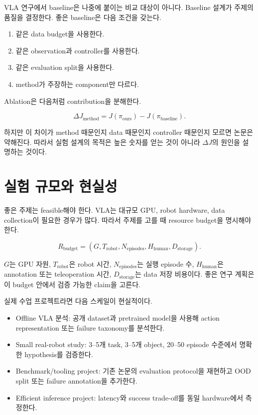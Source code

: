 VLA 연구에서 baseline은 나중에 붙이는 비교 대상이 아니다. Baseline 설계가 주제의 품질을 결정한다. 좋은 baseline은 다음 조건을 갖는다.

\begin{enumerate}
  \item 같은 data budget을 사용한다.
  \item 같은 observation과 controller를 사용한다.
  \item 같은 evaluation split을 사용한다.
  \item method가 주장하는 component만 다르다.
\end{enumerate}

Ablation은 다음처럼 contribution을 분해한다.

\begin{equation}
  \Delta J_{\mathrm{method}}
  =
  J(\pi_{\mathrm{ours}})
  -
  J(\pi_{\mathrm{baseline}}).
\end{equation}

하지만 이 차이가 method 때문인지 data 때문인지 controller 때문인지 모르면 논문은 약해진다. 따라서 실험 설계의 목적은 높은 숫자를 얻는 것이 아니라 $\Delta J$의 원인을 설명하는 것이다.

\section{실험 규모와 현실성}

좋은 주제는 feasible해야 한다. VLA는 대규모 GPU, robot hardware, data collection이 필요한 경우가 많다. 따라서 주제를 고를 때 resource budget을 명시해야 한다.

\begin{equation}
  R_{\mathrm{budget}}
  =
  (G, T_{\mathrm{robot}}, N_{\mathrm{episodes}}, H_{\mathrm{human}}, D_{\mathrm{storage}}).
\end{equation}

$G$는 GPU 자원, $T_{\mathrm{robot}}$은 robot 시간, $N_{\mathrm{episodes}}$는 실행 episode 수, $H_{\mathrm{human}}$은 annotation 또는 teleoperation 시간, $D_{\mathrm{storage}}$는 data 저장 비용이다. 좋은 연구 계획은 이 budget 안에서 검증 가능한 claim을 고른다.

실제 수업 프로젝트라면 다음 스케일이 현실적이다.

\begin{itemize}
  \item Offline VLA 분석: 공개 dataset과 pretrained model을 사용해 action representation 또는 failure taxonomy를 분석한다.
  \item Small real-robot study: 3--5개 task, 3--5개 object, 20--50 episode 수준에서 명확한 hypothesis를 검증한다.
  \item Benchmark/tooling project: 기존 논문의 evaluation protocol을 재현하고 OOD split 또는 failure annotation을 추가한다.
  \item Efficient inference project: latency와 success trade-off를 동일 hardware에서 측정한다.
\end{itemize}

